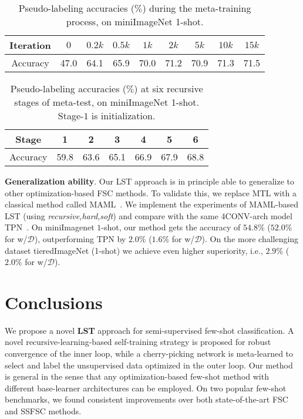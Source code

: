 \documentclass{article}
\newcommand{\myparagraph}[1]{\vspace{0.1em}\noindent\textbf{#1}}
\begin{document}
\begin{table*}[h]
\vspace{-3pt}
\footnotesize
\centering
\begin{tabular}{ccccccccc}
\toprule
Iteration & $0$ & $0.2k$ & $0.5k$ & $1k$ & $2k$ & $5k$ & $10k$ & $15k$\\
\midrule[1pt]
Accuracy & 47.0 & 64.1 & 65.9 & 70.0 & 71.2 & 70.9 & 71.3 & 71.5 \\
\bottomrule[1pt]
\end{tabular}
\vspace{-0.15cm}
\caption{Pseudo-labeling accuracies ($\%$) during the meta-training process, on miniImageNet 1-shot.}
\label{table_pl_train}
\end{table*} \begin{table*}[h]
\vspace{-5pt}
\footnotesize
\centering
\begin{tabular}{ccccccc}
\toprule
Stage & 1 & 2 & 3 & 4 & 5 & 6\\
\midrule[1pt]
Accuracy & 59.8 & 63.6 & 65.1 & 66.9 & 67.9 & 68.8 \\
\bottomrule[1pt]
\end{tabular}
\vspace{-0.15cm}
\caption{Pseudo-labeling accuracies ($\%$) at six recursive stages of meta-test, on miniImageNet 1-shot. Stage-$1$ is initialization.}
\label{table_pl_test}
\end{table*} 

\myparagraph{Generalization ability}.
Our LST approach is in principle able to generalize to other optimization-based FSC methods. To validate this, we replace MTL with a classical method called MAML~\cite{FinnAL17}.
We implement the experiments of MAML-based LST (using \emph{recursive,hard,soft}) and compare with the same 4CONV-arch model TPN~\cite{LiuICLR2019transductive}. 
On miniImagenet $1$-shot,
our method gets the accuracy of $54.8\%$ ($52.0\%$ for w/$\mathcal{D}$), outperforming TPN by $2.0\%$  ($1.6\%$ for w/$\mathcal{D}$).
On the more challenging dataset tieredImageNet (1-shot) we achieve even higher superiority, i.e., $2.9\%$ ($2.0\%$ for w/$\mathcal{D}$). 
 
% 

\section{Conclusions}
We propose a novel \textbf{LST} approach for semi-supervised few-shot classification. A novel recursive-learning-based self-training strategy is proposed for robust convergence of the inner loop, while a cherry-picking network is meta-learned to select and label the unsupervised data optimized in the outer loop. 
Our method is general in the sense that any optimization-based few-shot method with different base-learner architectures can be employed. On two popular few-shot benchmarks, we found consistent improvements over both state-of-the-art FSC and SSFSC methods.
\end{document}
